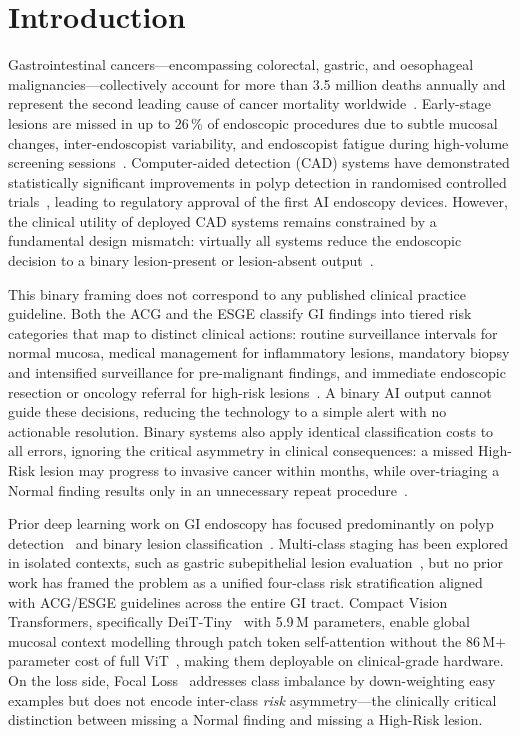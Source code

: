\documentclass[11pt,a4paper]{article}
\begin{document}
\section{Introduction}
\label{sec:intro}

Gastrointestinal cancers---encompassing colorectal, gastric, and oesophageal
malignancies---collectively account for more than 3.5 million deaths annually
and represent the second leading cause of cancer mortality
worldwide~\citep{Sung2021}. Early-stage lesions are missed in up to 26\,\% of
endoscopic procedures due to subtle mucosal changes, inter-endoscopist
variability, and endoscopist fatigue during high-volume screening
sessions~\citep{Kaminski2017}. Computer-aided detection (CAD) systems have
demonstrated statistically significant improvements in polyp detection in
randomised controlled trials~\citep{Wang2019}, leading to regulatory approval
of the first AI endoscopy devices. However, the clinical utility of deployed
CAD systems remains constrained by a fundamental design mismatch: virtually
all systems reduce the endoscopic decision to a binary lesion-present or
lesion-absent output~\citep{Pogorelov2017}.

This binary framing does not correspond to any published clinical practice
guideline. Both the ACG and the ESGE classify GI findings into tiered risk
categories that map to distinct clinical actions: routine surveillance
intervals for normal mucosa, medical management for inflammatory lesions,
mandatory biopsy and intensified surveillance for pre-malignant findings, and
immediate endoscopic resection or oncology referral for high-risk
lesions~\citep{Shaukat2021,Ferlitsch2017}. A binary AI output cannot guide
these decisions, reducing the technology to a simple alert with no actionable
resolution. Binary systems also apply identical classification costs
to all errors, ignoring the critical asymmetry in clinical consequences: a
missed High-Risk lesion may progress to invasive cancer within months, while
over-triaging a Normal finding results only in an unnecessary repeat
procedure~\citep{Rawla2019}.

Prior deep learning work on GI endoscopy has focused predominantly on polyp
detection~\citep{Tajbakhsh2016} and binary lesion
classification~\citep{Pogorelov2017}. Multi-class staging has been explored
in isolated contexts, such as gastric subepithelial lesion
evaluation~\citep{Ebigbo2019}, but no prior work has framed the problem as a
unified four-class risk stratification aligned with ACG/ESGE guidelines
across the entire GI tract. Compact Vision Transformers, specifically
DeiT-Tiny~\citep{Touvron2021} with 5.9\,M parameters, enable global mucosal
context modelling through patch token self-attention without the 86\,M$+$
parameter cost of full ViT~\citep{Dosovitskiy2021}, making them deployable on
clinical-grade hardware. On the loss side, Focal Loss~\citep{Lin2017}
addresses class imbalance by down-weighting easy examples but does not encode
inter-class \emph{risk} asymmetry---the clinically critical distinction
between missing a Normal finding and missing a High-Risk lesion.
\end{document}
